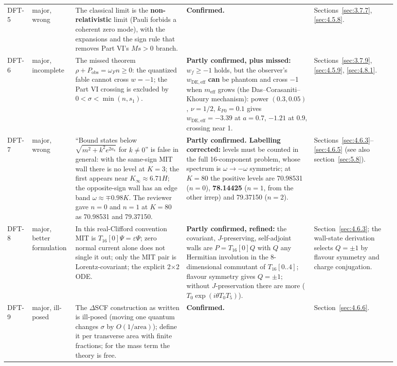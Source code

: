 {\begin{longtable}{@{}p{0.055\linewidth}p{0.095\linewidth}p{0.270\linewidth}p{0.310\linewidth}p{0.200\linewidth}@{}}
\raggedright DFT-5 & \raggedright major, wrong & \raggedright The classical limit is the \textbf{non-relativistic} limit (Pauli forbids a coherent zero mode), with the expansions and the sign rule that removes Part VI's $M s > 0$ branch. & \raggedright \textbf{Confirmed.} & \raggedright Sections~\ref{sec:3.7.7}, \ref{sec:4.5.8}. \tabularnewline
\raggedright DFT-6 & \raggedright major, incomplete & \raggedright The missed theorem $\rho + P_{\mathrm{obs}} = \omega_F n \geq 0$: the quantized fable cannot cross $w = -1$; the Part VI crossing is excluded by $0 < \sigma < \min(n, s_1)$. & \raggedright \textbf{Partly confirmed, plus missed:} $w_f \geq -1$ holds, but the observer's $w_{\mathrm{DE,eff}}$ \textbf{can} be phantom and cross \ensuremath{-}1 when $m_{\mathrm{eff}}$ grows (the Das--Corasaniti--Khoury mechanism): power $(0.3, 0.05)$, $\nu = 1/2$, $k_{F0} = 0.1$ gives $w_{\mathrm{DE,eff}} = -3.39$ at $a = 0.7$, $-1.21$ at 0.9, crossing near 1. & \raggedright Sections~\ref{sec:3.7.9}, \ref{sec:4.5.9}, \ref{sec:4.8.1}. \tabularnewline
\raggedright DFT-7 & \raggedright major, wrong & \raggedright ``Bound states below $\sqrt{m^{2} + k^{2} e^{2a_{4}}}$ for $k \neq 0$'' is false in general: with the same-sign MIT wall there is no level at $K = 3$; the first appears near $K_\infty \approx 6.71 H$; the opposite-sign wall has an edge band $\omega \approx \mp 0.98 K$. The reviewer gave $n = 0$ and $n = 1$ at $K = 80$ as 70.98531 and 79.37150. & \raggedright \textbf{Partly confirmed. Labelling corrected:} levels must be counted in the full 16-component problem, whose spectrum is $\omega \to -\omega$ symmetric; at $K = 80$ the positive levels are 70.98531 ($n = 0$), \textbf{78.14425} ($n = 1$, from the other irrep) and 79.37150 ($n = 2$). & \raggedright Sections~\ref{sec:4.6.3}--\ref{sec:4.6.5} (see also section~\ref{sec:5.8}). \tabularnewline
\raggedright DFT-8 & \raggedright major, better formulation & \raggedright In this real-Clifford convention MIT is $T_{16}[0] \Psi = \varepsilon \Psi$; zero normal current alone does not single it out; only the MIT pair is Lorentz-covariant; the explicit 2$\times$2 ODE. & \raggedright \textbf{Partly confirmed, refined:} the covariant, $J$-preserving, self-adjoint walls are $P = T_{16}[0] Q$ with $Q$ any Hermitian involution in the 8-dimensional commutant of $T_{16}[0..4]$; flavour symmetry gives $Q = \pm 1$; without $J$-preservation there are more ($T_0 \exp(i \theta T_0 T_{5})$). & \raggedright Section~\ref{sec:4.6.3}; the wall-state derivation selects $Q = \pm 1$ by flavour symmetry and charge conjugation. \tabularnewline
\raggedright DFT-9 & \raggedright major, ill-posed & \raggedright The $\Delta$SCF construction as written is ill-posed (moving one quantum changes $\sigma$ by $O(1/\mathrm{area})$); define it per transverse area with finite fractions; for the mass term the theory is free. & \raggedright \textbf{Confirmed.} & \raggedright Section~\ref{sec:4.6.6}. \tabularnewline

\end{longtable}}
